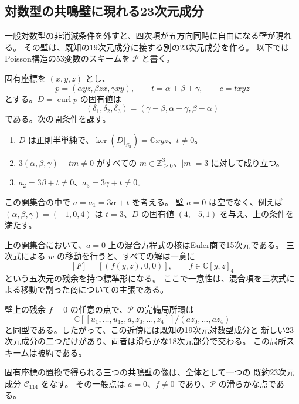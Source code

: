 \subsection{対数型の共鳴壁に現れる23次元成分}
\label{subsec:resonance23-v32}

一般対数型の非消滅条件を外すと、四次項が五方向同時に自由になる壁が現れる。
その壁は、既知の19次元成分に接する別の23次元成分を作る。
以下ではPoisson構造の53変数のスキームを $\mathscr P$ と書く。

固有座標を $(x,y,z)$ とし、
\[
 p=(\alpha yz,\beta zx,\gamma xy),\qquad
 t=\alpha+\beta+\gamma,\qquad c=txyz
\]
とする。$D=\operatorname{curl}p$ の固有値は
\[
 (\delta_1,\delta_2,\delta_3)
 =(\gamma-\beta,\alpha-\gamma,\beta-\alpha)
\]
である。次の開条件を課す。
\begin{enumerate}
\item $D$ は正則半単純で、$\ker(D|_{S_3})=\mathbb Cxyz$、$t\neq0$。
\item $3(\alpha,\beta,\gamma)-tm\neq0$ がすべての
      $m\in\mathbb Z_{\geq0}^3$、$|m|=3$ に対して成り立つ。
\item $a_2=3\beta+t\neq0$、$a_3=3\gamma+t\neq0$。
\end{enumerate}
この開集合の中で $a=a_1=3\alpha+t$ を考える。
壁 $a=0$ は空でなく、例えば $(\alpha,\beta,\gamma)=(-1,0,4)$ は
$t=3$、$D$ の固有値 $(4,-5,1)$ を与え、上の条件を満たす。

\begin{theorem}
\label{thm:resonance23-v32}
上の開集合において、$a=0$ 上の混合方程式の核はEuler商で15次元である。
三次式による $w$ の移動を行うと、すべての解は一意に
\[
 [F]=[(f(y,z),0,0)],\qquad f\in\mathbb C[y,z]_4
\]
という五次元の残余を持つ標準形になる。
ここで一意性は、混合項を三次式による移動で割った商についての主張である。

壁上の残余 $f=0$ の任意の点で、$\mathscr P$ の完備局所環は
\[
 \mathbb C[[u_1,\ldots,u_{18},a,z_0,\ldots,z_4]]
       /(az_0,\ldots,az_4)
\]
と同型である。したがって、この近傍には既知の19次元対数型成分と
新しい23次元成分の二つだけがあり、両者は滑らかな18次元部分で交わる。
この局所スキームは被約である。

固有座標の置換で得られる三つの共鳴壁の像は、全体として一つの
既約23次元成分 $\mathscr C_{114}$ をなす。
その一般点は $a=0$、$f\neq0$ であり、$\mathscr P$ の滑らかな点である。
\end{theorem}

